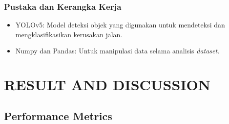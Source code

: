 \documentclass[12pt,a4paper]{article}
\begin{document}
\subsubsection{Pustaka dan Kerangka Kerja}
\begin{itemize}
    \item YOLOv5: Model deteksi objek yang digunakan untuk mendeteksi dan mengklasifikasikan kerusakan jalan.
    \item Numpy dan Pandas: Untuk manipulasi data selama analisis \textit{dataset}.
\end{itemize}

\section{RESULT AND DISCUSSION}
\subsection{Performance Metrics}
\end{document}
